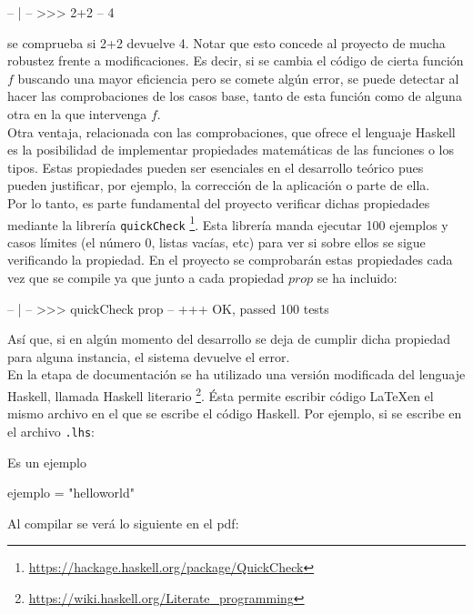 \begin{code}
-- | 
-- >>> 2+2
-- 4
\end{code}

se comprueba si 2+2 devuelve 4. Notar que esto concede al proyecto de mucha robustez frente a modificaciones. Es decir, si se cambia el código de cierta función $f$ buscando una mayor eficiencia pero se comete algún error, se puede detectar al hacer las comprobaciones de los casos base, tanto de esta función como de alguna otra en la que intervenga $f$.\\

Otra ventaja, relacionada con las comprobaciones, que ofrece el lenguaje Haskell es la posibilidad de implementar propiedades matemáticas de las funciones o los tipos. Estas propiedades pueden ser esenciales en el desarrollo teórico pues pueden justificar, por ejemplo, la corrección de la aplicación o parte de ella.\\

Por lo tanto, es parte fundamental del proyecto verificar dichas propiedades mediante la librería \texttt{quickCheck} \footnote{\url{https://hackage.haskell.org/package/QuickCheck}}. Esta librería manda ejecutar 100 ejemplos y casos límites (el número 0, listas vacías, etc) para ver si sobre ellos se sigue verificando la propiedad. En el proyecto se comprobarán estas propiedades cada vez que se compile ya que junto a cada propiedad $prop$ se ha incluido:

\begin{code}
-- | 
-- >>> quickCheck prop
--  +++ OK, passed 100 tests
\end{code}

Así que, si en algún momento del desarrollo se deja de cumplir dicha propiedad para alguna instancia, el sistema devuelve el error.\\

En la etapa de documentación se ha utilizado una versión modificada del lenguaje Haskell, llamada Haskell literario \footnote{\url{https://wiki.haskell.org/Literate_programming}}. Ésta permite escribir código \LaTeX en el mismo archivo en el que se escribe el código Haskell. Por ejemplo, si se escribe en el archivo \texttt{.lhs}:

\begin{codigo}
Es un ejemplo
\begin{code}
ejemplo = "helloworld"
\end{code}
\end{codigo}

Al compilar se verá lo siguiente en el pdf:\\

